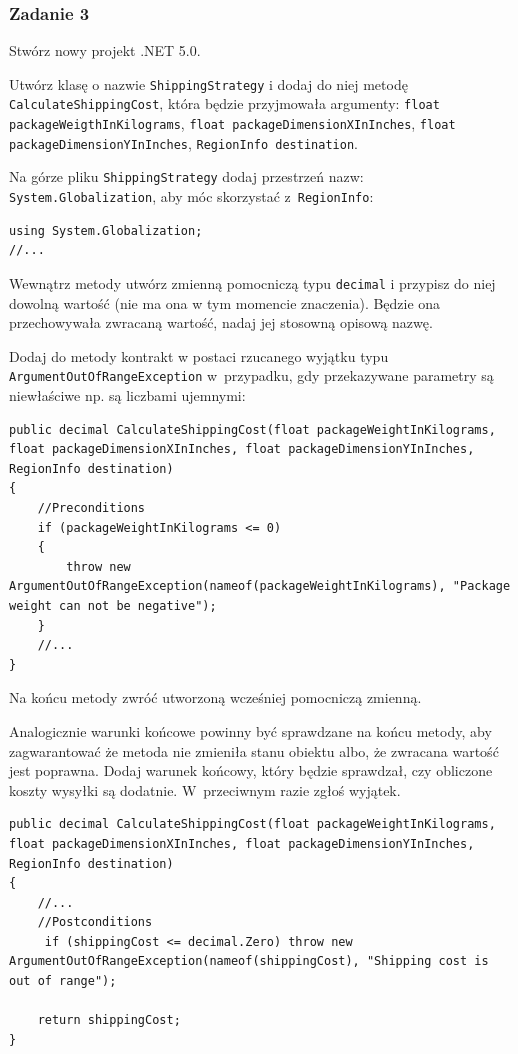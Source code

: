 \subsubsection{Zadanie 3}

Stwórz nowy projekt .NET 5.0.



Utwórz klasę o nazwie \texttt{ShippingStrategy} i dodaj do niej metodę \texttt{CalculateShippingCost}, która będzie przyjmowała argumenty: \texttt{float packageWeigthInKilograms}, \texttt{float packageDimensionXInInches}, \texttt{float packageDimensionYInInches}, \texttt{RegionInfo destination}.

Na górze pliku \texttt{ShippingStrategy} dodaj przestrzeń nazw: \texttt{System.Globalization}, aby móc skorzystać z~\texttt{RegionInfo}:
\begin{lstlisting}
using System.Globalization;
//...
\end{lstlisting}

Wewnątrz metody utwórz zmienną pomocniczą typu \texttt{decimal} i przypisz do niej dowolną wartość (nie ma ona w tym momencie znaczenia). Będzie ona przechowywała zwracaną wartość, nadaj jej stosowną opisową nazwę.

Dodaj do metody kontrakt w postaci rzucanego wyjątku typu \texttt{ArgumentOutOfRangeException} w~przypadku, gdy przekazywane parametry są niewłaściwe np. są liczbami ujemnymi:
\begin{lstlisting}
public decimal CalculateShippingCost(float packageWeightInKilograms, float packageDimensionXInInches, float packageDimensionYInInches, RegionInfo destination)
{
	//Preconditions
	if (packageWeightInKilograms <= 0)
	{
		throw new ArgumentOutOfRangeException(nameof(packageWeightInKilograms), "Package weight can not be negative");
	}
	//...
}
\end{lstlisting}

Na końcu metody zwróć utworzoną wcześniej pomocniczą zmienną.

Analogicznie warunki końcowe powinny być sprawdzane na końcu metody, aby zagwarantować że metoda nie zmieniła stanu obiektu albo, że zwracana wartość jest poprawna. Dodaj warunek końcowy, który będzie sprawdzał, czy obliczone koszty wysyłki są dodatnie. W~przeciwnym razie zgłoś wyjątek.
\begin{lstlisting}
public decimal CalculateShippingCost(float packageWeightInKilograms, float packageDimensionXInInches, float packageDimensionYInInches, RegionInfo destination)
{
	//...
	//Postconditions
     if (shippingCost <= decimal.Zero) throw new ArgumentOutOfRangeException(nameof(shippingCost), "Shipping cost is out of range");
	
	return shippingCost;
}
\end{lstlisting}



